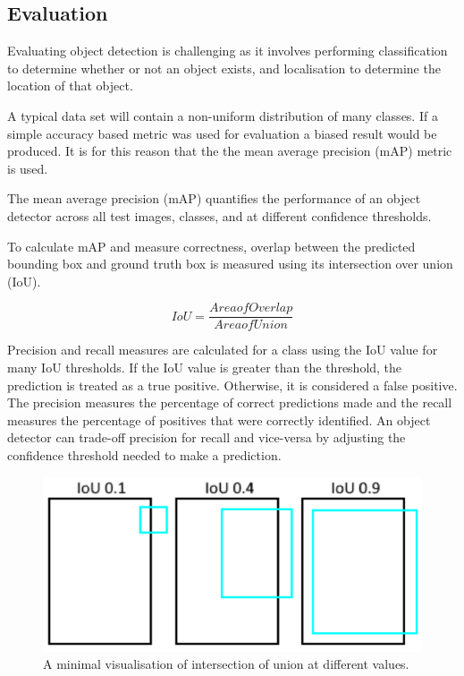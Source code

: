 \documentclass{thesis}
\begin{document}
\subsection{Evaluation}

Evaluating object detection is challenging as it involves performing classification to determine whether or not an object exists, and localisation to determine the location of that object. 

A typical data set will contain a non-uniform distribution of many classes. If a simple accuracy based metric was used for evaluation a biased result would be produced. It is for this reason that the the mean average precision (mAP) metric is used.

The mean average precision (mAP) quantifies the performance of an object detector across all test images, classes, and at different confidence thresholds.

To calculate mAP and measure correctness, overlap between the predicted bounding box and ground truth box is measured using its intersection over union (IoU). 

\begin{equation}
    IoU = \frac{Area of Overlap}{Area of Union}
\end{equation}

Precision and recall measures are calculated for a class using the IoU value for many IoU thresholds. If the IoU value is greater than the threshold, the prediction is treated as a true positive. Otherwise, it is considered a false positive. The precision measures the percentage of correct predictions made and the recall measures the percentage of positives that were correctly identified. An object detector can trade-off precision for recall and vice-versa by adjusting the confidence threshold needed to make a prediction.

\begin{figure}[h]
    \centering
    \includegraphics[scale=0.5]{images/iou.png}
    \caption{A minimal visualisation of intersection of union at different values.}
    \label{fig:cnn-diagram}
\end{figure}
\end{document}
